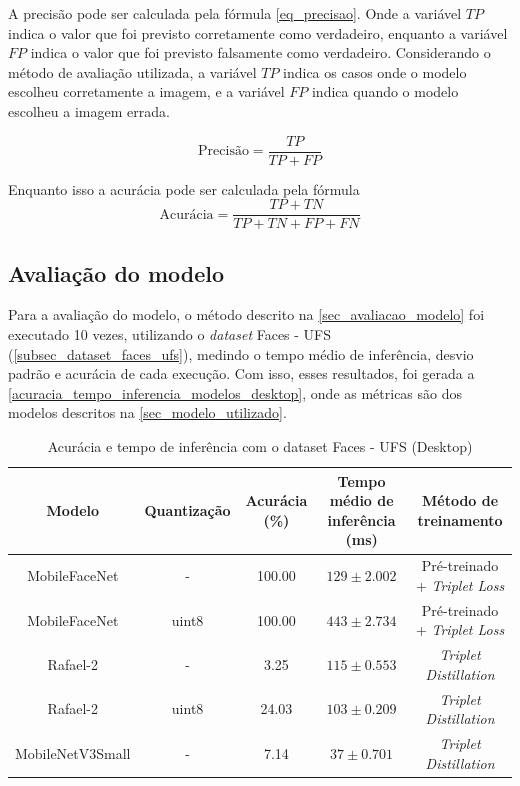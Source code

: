 \label{sect_restultados_metricas_precisao}
A precisão pode ser calculada pela fórmula \ref{eq_precisao}. Onde a variável $TP$ indica o valor que foi previsto corretamente como verdadeiro,
enquanto a variável $FP$ indica o valor que foi previsto falsamente como verdadeiro.
Considerando o método de avaliação utilizada, a variável $TP$ indica os casos onde o modelo escolheu corretamente a
imagem, e a variável $FP$  indica quando o modelo escolheu a imagem errada.

\begin{equation}\label{eq_precisao}
	\text{Precisão} = \frac {TP} {TP + FP}
\end{equation}

\label{sect_restultados_metricas_acuracia}
Enquanto isso a acurácia pode ser calculada pela fórmula \
\begin{equation}\label{eq_acuracia}
	\text{Acurácia} = \frac {TP + TN} {TP + TN + FP + FN}
\end{equation}

\subsection{Avaliação do modelo}
Para a avaliação do modelo, o método descrito na \autoref{sec_avaliacao_modelo} foi executado 10 vezes,
utilizando o \textit{dataset} Faces - UFS (\ref{subsec_dataset_faces_ufs}), medindo o tempo médio de inferência,
desvio padrão e acurácia de cada execução.
Com isso, esses resultados, foi gerada a \autoref{acuracia_tempo_inferencia_modelos_desktop}, onde as
métricas são dos modelos descritos na \autoref{sec_modelo_utilizado}.


\begin{table}[htb]
\centering
\ABNTEXfontereduzida
\caption[]{Acurácia e tempo de inferência com o dataset Faces - UFS (Desktop)}
\label{acuracia_tempo_inferencia_modelos_desktop}
\begin{tabular}{ |c|c|c|c|c| }
	\hline
	\textbf{Modelo} & \textbf{Quantização} & \textbf{Acurácia (\%)} & \textbf{Tempo médio de inferência (ms)} & \textbf{Método de treinamento} \\
	\hline
	MobileFaceNet 	&-	& 	100.00  & $129 \pm 2.002$ & Pré-treinado + \textit{Triplet Loss} \\
	MobileFaceNet 	&uint8	& 	100.00  & $443 \pm 2.734$ & Pré-treinado + \textit{Triplet Loss} \\
	Rafael-2	&-	& 	 3.25 & $115 \pm 0.553$ & \textit{Triplet Distillation} \\
	Rafael-2	&uint8	& 	 24.03& $103 \pm 0.209$ & \textit{Triplet Distillation} \\
	MobileNetV3Small&-	& 	 7.14& $37 \pm 0.701$ & \textit{Triplet Distillation} \\
	\hline
\end{tabular}
\end{table}

